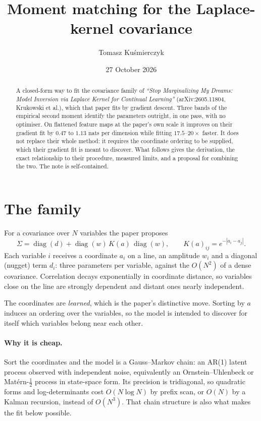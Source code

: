 \documentclass[11pt,a4paper]{article}
\title{Moment matching for the Laplace-kernel covariance}
\author{Tomasz Ku\'smierczyk}
\date{27 October 2026}
\begin{document}
\maketitle

\begin{abstract}
\noindent
A closed-form way to fit the covariance family of \emph{``Stop Marginalizing My Dreams: Model
Inversion via Laplace Kernel for Continual Learning''} (arXiv:2605.11804, Krukowski et al.),
which that paper fits by gradient descent. Three bands of the empirical second moment identify
the parameters outright, in one pass, with no optimiser. On flattened feature maps at the
paper's own scale it improves on their gradient fit by $0.47$ to $1.13$ nats per dimension
while fitting $17.5$--$20\times$ faster. It does not replace their whole method: it requires
the coordinate ordering to be supplied, which their gradient fit is meant to discover. What
follows gives the derivation, the exact relationship to their procedure, measured limits, and
a proposal for combining the two. The note is self-contained.
\end{abstract}

\section{The family}

For a covariance over $N$ variables the paper proposes
\begin{equation}
  \Sigma = \operatorname{diag}(d) + \operatorname{diag}(w)\, K(a)\, \operatorname{diag}(w),
  \qquad
  K(a)_{ij} = e^{-|a_i - a_j|}.
  \label{eq:family}
\end{equation}
Each variable $i$ receives a coordinate $a_i$ on a line, an amplitude $w_i$ and a diagonal
(nugget) term $d_i$: three parameters per variable, against the $O(N^2)$ of a dense covariance.
Correlation decays exponentially in coordinate distance, so variables close on the line are
strongly dependent and distant ones nearly independent.

The coordinates are \emph{learned}, which is the paper's distinctive move. Sorting by $a$
induces an ordering over the variables, so the model is intended to discover for itself which
variables belong near each other.

\paragraph{Why it is cheap.} Sort the coordinates and the model is a Gauss--Markov chain: an
AR(1) latent process observed with independent noise, equivalently an Ornstein--Uhlenbeck or
Mat\'ern-$\tfrac12$ process in state-space form. Its precision is tridiagonal, so quadratic
forms and log-determinants cost $O(N \log N)$ by prefix scan, or $O(N)$ by a Kalman recursion,
instead of $O(N^3)$. That chain structure is also what makes the fit below possible.
\end{document}
